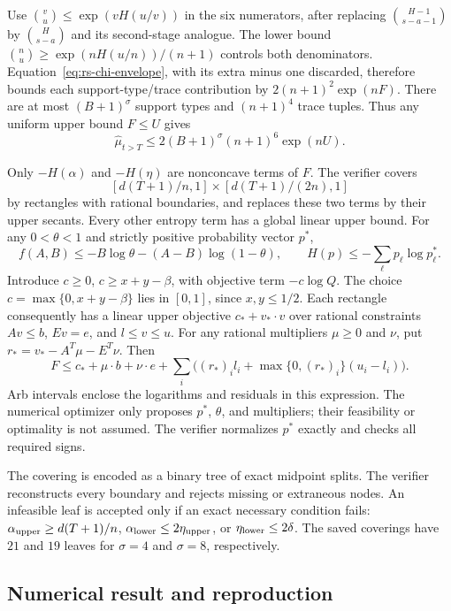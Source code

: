 Use $\binom vu\le\exp(vH(u/v))$ in the six numerators, after replacing
$\binom{H-1}{s-a-1}$ by $\binom H{s-a}$ and its second-stage analogue.
The lower bound $\binom nu\ge\exp(nH(u/n))/(n+1)$ controls both denominators.
Equation~\eqref{eq:rs-chi-envelope}, with its extra minus one discarded,
therefore bounds each support-type/trace contribution by
$2(n+1)^2\exp(nF)$.  There are at most $(B+1)^\sigma$ support types and
$(n+1)^4$ trace tuples.  Thus any uniform upper bound $F\le U$ gives
\begin{equation}
 \widehat\mu_{t>T}\le
       2(B+1)^\sigma(n+1)^6\exp(nU).
 \label{eq:rs-bulk-finite}
\end{equation}

Only $-H(\alpha)$ and $-H(\eta)$ are nonconcave terms of $F$.
The verifier covers
\[
 [d(T+1)/n,1]\times[d(T+1)/(2n),1]
\]
by rectangles with rational boundaries, and replaces these two terms by
their upper secants.  Every other entropy term has a global linear upper
bound.  For any $0<\theta<1$ and strictly positive probability vector $p^*$,
\[
 f(A,B)\le-B\log\theta-(A-B)\log(1-\theta),\qquad
 H(p)\le-\sum_\ell p_\ell\log p^*_\ell.
\]
Introduce $c\ge0$, $c\ge x+y-\beta$, with objective term $-c\log Q$.
The choice $c=\max\{0,x+y-\beta\}$ lies in $[0,1]$, since $x,y\le1/2$.
Each rectangle consequently has a linear upper objective $c_*+v_*\cdot v$
over rational constraints $Av\le b$, $Ev=e$, and $l\le v\le u$.
For any rational multipliers $\mu\ge0$ and $\nu$, put
$r_*=v_*-A^T\mu-E^T\nu$.  Then
\begin{equation}
 F\le c_*+\mu\cdot b+\nu\cdot e
       +\sum_i\bigl((r_*)_i l_i+\max\{0,(r_*)_i\}(u_i-l_i)\bigr).
 \label{eq:rs-dual-check}
\end{equation}
Arb intervals enclose the logarithms and residuals in this expression.
The numerical optimizer only proposes $p^*$, $\theta$, and multipliers;
their feasibility or optimality is not assumed.  The verifier normalizes
$p^*$ exactly and checks all required signs.

The covering is encoded as a binary tree of exact midpoint splits.  The
verifier reconstructs every boundary and rejects missing or extraneous nodes.
An infeasible leaf is accepted only if an exact necessary condition fails:
$\alpha_{\rm upper}\ge d(T+1)/n$,
$\alpha_{\rm lower}\le2\eta_{\rm upper}$, or
$\eta_{\rm lower}\le2\delta$.  The saved coverings have $21$ and $19$ leaves
for $\sigma=4$ and $\sigma=8$, respectively.

\subsection{Numerical result and reproduction}

